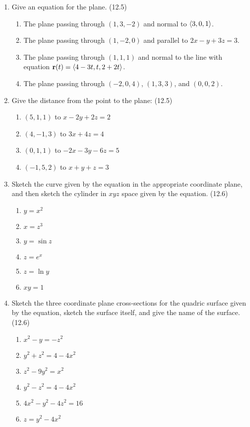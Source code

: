 \begin{enumerate}
    \newpage

    \item Give an equation for the plane. (12.5)

      \begin{enumerate}
        \item The plane passing through $(1,3,-2)$ and normal to $\left<3,0,1\right>$.
        \item The plane passing through $(1,-2,0)$ and parallel to $2x-y+3z=3$.
        \item The plane passing through $(1,1,1)$ and normal to the line with equation $\mathbf{r}(t)=\left<4-3t,t,2+2t\right>$.
        \item The plane passing through $(-2,0,4)$, $(1,3,3)$, and $(0,0,2)$.
      \end{enumerate}

    \item Give the distance from the point to the plane: (12.5)

      \begin{enumerate}
        \item $(5,1,1)$ to $x-2y+2z=2$
        \item $(4,-1,3)$ to $3x+4z=4$
        \item $(0,1,1)$ to $-2x-3y-6z=5$
        \item $(-1,5,2)$ to $x+y+z=3$
      \end{enumerate}

    \item Sketch the curve given by the equation in the appropriate coordinate plane, and then sketch the cylinder in $xyz$ space given by the equation. (12.6)

      \begin{enumerate}
        \item $y=x^2$
        \item $x=z^3$
        \item $y=\sin z$
        \item $z=e^x$
        \item $z=\ln y$
        \item $xy=1$
      \end{enumerate}

    \item Sketch the three coordinate plane cross-sections for the quadric surface given by the equation, sketch the surface itself, and give the name of the surface. (12.6)

      \begin{enumerate}
        \item $x^2-y=-z^2$
        \item $y^2+z^2=4-4x^2$
        \item $z^2-9y^2=x^2$
        \item $y^2-z^2=4-4x^2$
        \item $4x^2-y^2-4z^2=16$
        \item $z=y^2-4x^2$
      \end{enumerate}


\end{enumerate}
